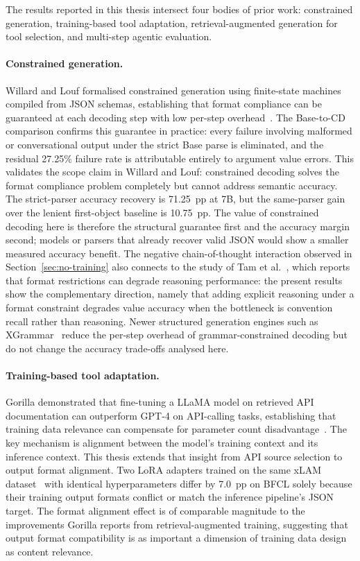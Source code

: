 The results reported in this thesis intersect four bodies of prior work:
constrained generation, training-based tool adaptation, retrieval-augmented
generation for tool selection, and multi-step agentic evaluation.

\paragraph{Constrained generation.}
Willard and Louf formalised constrained generation using finite-state
machines compiled from JSON schemas, establishing that format compliance can
be guaranteed at each decoding step with low per-step
overhead~\cite{willard2023efficient}. The Base-to-CD comparison confirms this
guarantee in practice: every failure involving malformed or conversational
output under the strict Base parse is eliminated, and the residual 27.25\%
failure rate is attributable entirely to argument value errors. This validates
the scope claim in Willard and Louf: constrained decoding solves the format
compliance problem completely but cannot address semantic accuracy. The
strict-parser accuracy recovery is 71.25~pp at 7B, but the same-parser gain over
the lenient first-object baseline is 10.75~pp. The value of constrained decoding
here is therefore the structural guarantee first and the accuracy margin second;
models or parsers that already recover valid JSON would show a smaller measured
accuracy benefit.
The negative chain-of-thought interaction observed in
Section~\ref{sec:no-training} also connects to the study of Tam et
al.~\cite{tam2024letmespeak}, which reports that format restrictions can
degrade reasoning performance: the present results show the complementary
direction, namely that adding explicit reasoning under a format constraint
degrades value accuracy when the bottleneck is convention recall rather
than reasoning. Newer structured generation engines such as
XGrammar~\cite{dong2024xgrammar} reduce the per-step overhead of
grammar-constrained decoding but do not change the accuracy trade-offs
analysed here.

\paragraph{Training-based tool adaptation.}
Gorilla demonstrated that fine-tuning a LLaMA model on retrieved API
documentation can outperform GPT-4 on API-calling tasks, establishing that
training data relevance can compensate for parameter count
disadvantage~\cite{patil2023gorilla}. The key mechanism is alignment between
the model's training context and its inference context. This thesis extends
that insight from API source selection to output format alignment. Two LoRA
adapters trained on the same xLAM dataset~\cite{zhang2024xlam} with identical hyperparameters
differ by 7.0~pp on BFCL solely because their training output formats
conflict or match the inference pipeline's JSON target.
The format alignment effect is of comparable magnitude to the improvements
Gorilla reports from retrieval-augmented training, suggesting that output
format compatibility is as important a dimension of training data design as
content relevance.

